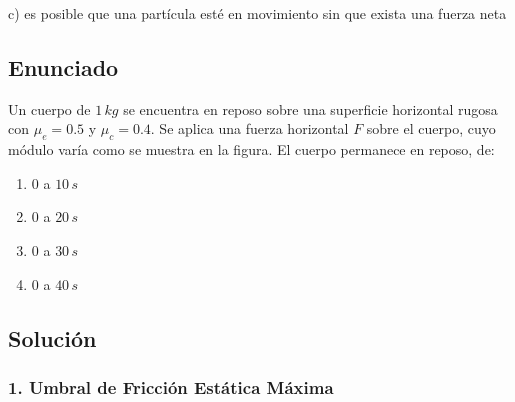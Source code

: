 \documentclass[12pt, a4paper]{article}
\begin{document}
\begin{tcolorbox}[colback=green!5!white, colframe=green!50!black, title=Respuesta Final]
\centering \Large c) es posible que una partícula esté en movimiento sin que exista una fuerza neta
\end{tcolorbox}

\newpage

\subsection*{Enunciado}
Un cuerpo de $1\,\si{kg}$ se encuentra en reposo sobre una superficie horizontal rugosa con $\mu_e = 0.5$ y $\mu_c = 0.4$. Se aplica una fuerza horizontal $F$ sobre el cuerpo, cuyo módulo varía como se muestra en la figura. El cuerpo permanece en reposo, de:

\begin{center}
\end{center}

\begin{enumerate}[label=\alph*)]
    \item $0$ a $10\,\si{s}$
    \item $0$ a $20\,\si{s}$
    \item $0$ a $30\,\si{s}$
    \item $0$ a $40\,\si{s}$
\end{enumerate}

\subsection*{Solución}

\subsubsection*{1. Umbral de Fricción Estática Máxima}
\end{document}
